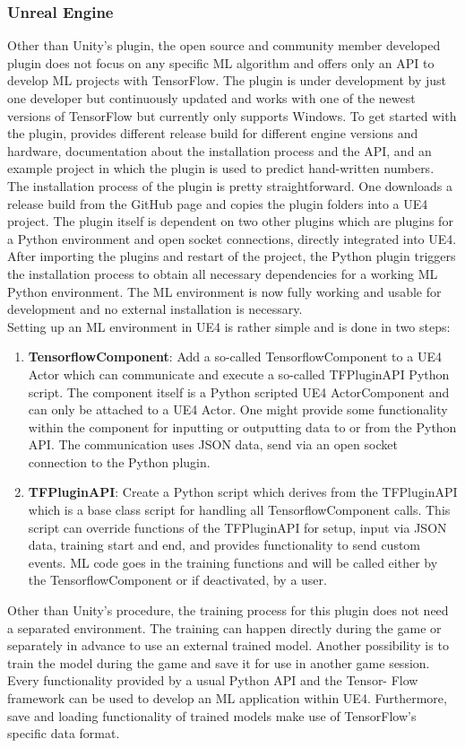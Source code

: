 \documentclass[MGS,Master,english]{twbook}%
\begin{document}
\subsubsection{Unreal Engine}
Other than Unity’s plugin, the open source and community member developed plugin does not focus on any specific ML algorithm and offers only an API to develop ML projects with TensorFlow. The plugin is under development by just one developer but continuously updated and works with one of the newest versions of TensorFlow but currently only supports Windows. To get started with the plugin, \cite{ue4::tensorFlowPlugin} provides different release build for different engine versions and hardware, documentation about the installation process and the API, and an example project in which the plugin is used to predict hand-written numbers.\\
The installation process of the plugin is pretty straightforward. One downloads a release build from the GitHub page and copies the plugin folders into a \ac{UE4} project. The plugin itself is dependent on two other plugins which are plugins for a Python environment and open socket connections, directly integrated into UE4. After importing the plugins and restart of the project, the Python plugin triggers the installation process to obtain all necessary dependencies for a working ML Python environment. The ML environment is now fully working and usable for development and no external installation is necessary.\\
Setting up an ML environment in UE4 is rather simple and is done in two steps:
\begin{enumerate}
	\item \textbf{TensorflowComponent}: Add a so-called TensorflowComponent to a UE4 Actor which can communicate and execute a so-called TFPluginAPI Python script. The component itself is a Python scripted UE4 ActorComponent and can only be attached to a UE4 Actor. One might provide some functionality within the component for inputting or outputting data to or from the Python API. The communication uses JSON data, send via an open socket connection to the Python plugin.
	\item \textbf{TFPluginAPI}: Create a Python script which derives from the TFPluginAPI which is a base class script for handling all TensorflowComponent calls. This script can override functions of the TFPluginAPI for setup, input via JSON data, training start and end, and provides functionality to send custom events. ML code goes in the training functions and will be called either by the TensorflowComponent or if deactivated, by a user.
\end{enumerate}
Other than Unity’s procedure, the training process for this plugin does not need a separated environment. The training can happen directly during the game or separately in advance to use an external trained model. Another possibility is to train the model during the game and save it for use in another game session. Every functionality provided by a usual Python API and the Tensor- Flow framework can be used to develop an ML application within UE4. Furthermore, save and loading functionality of trained models make use of TensorFlow’s specific data format.
\end{document}
